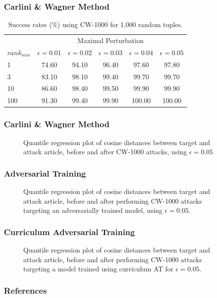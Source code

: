 \documentclass{beamer}
\begin{document}
	\begin{frame}
		\frametitle{Carlini \& Wagner Method}
		\begin{table}[H]
			\centering
			\begin{tabular}{ lccccc } 
				\toprule		
				& \multicolumn{5}{c}{Maximal Perturbation} \\
				\cmidrule{2-6}
				$rank_{min}$ & $\epsilon = 0.01$ & $\epsilon = 0.02$ & $\epsilon = 0.03$  & $\epsilon = 0.04$ & $\epsilon = 0.05$  \\
				\midrule
				1 & 74.60 & 94.10 & 96.40 & 97.60 & 97.80 \\
				3 & 83.10 & 98.10 & 99.40 & 99.70 & 99.70 \\
				10 & 86.60 & 98.40 & 99.50 & 99.90 & 99.90 \\
				100 & 91.30 & 99.40 & 99.90 & 100.00 & 100.00 \\
				\bottomrule
			\end{tabular}
			\caption{Success rates (\%) using CW-1000 for 1,000 random tuples.}
			\label{tab:cw-results}
		\end{table}
	\end{frame}
	
	\begin{frame}
		\frametitle{Carlini \& Wagner Method}
		\begin{figure}[H]
			\centering
			\resizebox{0.7\textwidth}{!}{}
			\caption{Quantile regression plot of cosine distances between target and attack article, before and after CW-1000 attacks, using $\epsilon=0.05$}
			\label{fig:cw-quantile}
		\end{figure}
	\end{frame}
	
	\begin{frame}
		\frametitle{Adversarial Training}
		\begin{figure}[H]
			\centering
			\resizebox{0.7\textwidth}{!}{}
			\caption{Quantile regression plot of cosine distances between target and attack article, before and after performing CW-1000 attacks targeting an adversarially trained model, using $\epsilon=0.05$.}
			\label{fig:adv-quantile}
		\end{figure}
	\end{frame}
	
	
	\begin{frame}
		\frametitle{Curriculum Adversarial Training}
		\begin{figure}[H]
			\centering
			\resizebox{0.7\textwidth}{!}{}
			\caption{Quantile regression plot of cosine distances between target and attack article, before and after performing CW-1000 attacks targeting a model trained using curriculum AT for $\epsilon=0.05$.}
			\label{fig:curr-adv-quantile}
		\end{figure}
	\end{frame}
	
	\begin{frame}[allowframebreaks]
		\frametitle{References}
		\printbibliography
	\end{frame}
	
\end{document}
